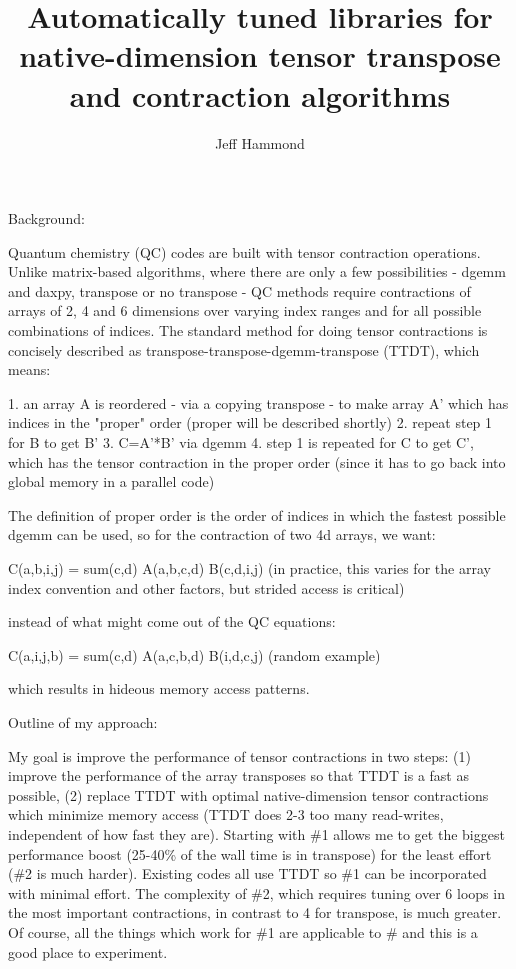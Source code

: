 \documentclass[letterpaper,12pt]{article}
\title{Automatically tuned libraries for native-dimension tensor transpose and contraction algorithms}
\author{Jeff Hammond}
\begin{document}
\maketitle

\begin{abstract}

\end{abstract}

Background:

Quantum chemistry (QC) codes are built with tensor contraction operations.  Unlike matrix-based algorithms, where there are only a few possibilities - dgemm and daxpy, transpose or no transpose - QC methods require contractions of arrays of 2, 4 and 6 dimensions over varying index ranges and for all possible combinations of indices.  The standard method for doing tensor contractions is concisely described as transpose-transpose-dgemm-transpose (TTDT), which means:

1. an array A is reordered - via a copying transpose - to make array
A' which has indices in the "proper" order (proper will be described
shortly)
2. repeat step 1 for B to get B'
3. C=A'*B' via dgemm
4. step 1 is repeated for C to get C', which has the tensor
contraction in the proper order (since it has to go back into global
memory in a parallel code)

The definition of proper order is the order of indices in which the fastest possible dgemm can be used, so for the contraction of two 4d arrays, we want:

C(a,b,i,j) = sum(c,d) A(a,b,c,d) B(c,d,i,j) (in practice, this varies for the array index convention and other factors, but strided access is critical)

instead of what might come out of the QC equations:

C(a,i,j,b) = sum(c,d) A(a,c,b,d) B(i,d,c,j) (random example)

which results in hideous memory access patterns.

Outline of my approach:

My goal is improve the performance of tensor contractions in two steps: (1) improve the performance of the array transposes so that TTDT is a fast as possible, (2) replace TTDT with optimal native-dimension tensor contractions which minimize memory access (TTDT does 2-3 too many read-writes, independent of how fast they are).  Starting with \#1 allows me to get the biggest performance boost (25-40\% of the wall time is in transpose) for the least effort (\#2 is much harder).  Existing codes all use TTDT so \#1 can be incorporated with minimal effort.  The complexity of \#2, which requires tuning over 6 loops in the most important contractions, in contrast to 4 for transpose, is much greater.  Of course, all the things which work for \#1 are applicable to \# and this is a good place to experiment.
\end{document}
